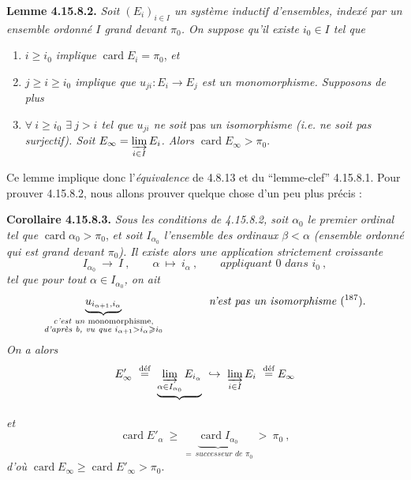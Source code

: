 \documentclass[11pt]{article}
\newcommand{\msp}[1]{\marginpar{\footnotesize [#1]}}
\newcommand{\card}{\operatorname{card}}
\begin{document}
\msp{page 458}
\textbf{Lemme 4.15.8.2.} \textit{Soit $(E_i)_{i\in I}$ un système inductif d'ensembles, indexé par un ensemble ordonné $I$ grand devant $\pi_0$. On suppose qu'il existe $i_0 \in I$ tel que}
\begin{enumerate}[nosep]
\item[\textit{a)}] \textit{$i \geqslant i_0$ implique} $\card E_i = \pi_0$, \textit{et}
\item[\textit{b)}] \textit{$j \geqslant i \geqslant i_0$ implique que $u_{ji} : E_i \longrightarrow E_j$ est un monomorphisme. Supposons de plus}
\item[\textit{c)}] \textit{$\forall\ i \geqslant i_0$ $\exists\ j > i$ tel que $u_{ji}$ ne soit} pas \textit{un isomorphisme (i.e. ne soit pas surjectif). Soit $E_\infty = \varinjlim\limits_{i\in I} E_i$. Alors} $\card E_\infty > \pi_0$.
\end{enumerate}
Ce lemme implique donc l'\textit{équivalence} de 4.8.13 et du “lemme-clef” 4.15.8.1. Pour prouver 4.15.8.2, nous allons prouver quelque chose d'un peu plus précis :

\textbf{Corollaire 4.15.8.3.} \textit{Sous les conditions de 4.15.8.2, soit $\alpha_0$ le premier ordinal tel que} $\card \alpha_0 > \pi_0$, \textit{et soit $I_{\alpha_0}$ l'ensemble des ordinaux $\beta < \alpha$ (ensemble ordonné qui est grand devant $\pi_0$). Il existe alors une application strictement croissante}
\[
I_{\alpha_0} \ \longrightarrow \ I \ , \qquad \alpha \ \longmapsto \ i_\alpha \ , \qquad \textit{appliquant } 0 \textit{ dans } i_0 \ ,
\]
\msp{page 459}
\textit{tel que pour tout $\alpha \in I_{\alpha_0}$, on ait}
\[
\underbrace{u_{i_{\alpha+1},i_\alpha}}_{\substack{\textit{c'est un } \text{monomorphisme,}\\ \textit{d'après b, vu que } i_{\alpha+1} > i_\alpha \geqslant i_0}} \qquad\qquad \text{\textit{n'est pas un isomorphisme} (\footnotemark[187]).}
\]
\textit{On a alors}
\[
E'_\infty \ \overset{\text{déf}}{=} \ \underbrace{\varinjlim_{\alpha\in I_{\alpha_0}} E_{i_\alpha}}_{} \ \hookrightarrow \ \varinjlim_{i\in I} E_i \ \overset{\text{déf}}{=} E_\infty
\]
\textit{et}
\[
\card E'_\alpha \ \geqslant \ \underbrace{\card I_{\alpha_0}}_{=\ \textit{successeur de } \pi_0} \ > \ \pi_0 \ ,
\] %
\textit{d'où} $\card E_\infty \geqslant \card E'_\infty > \pi_0$.
\end{document}
